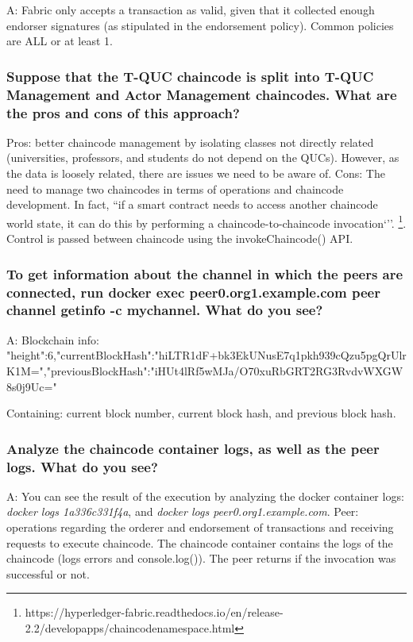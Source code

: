 \documentclass[12pt,a4paper]{article}
\begin{document}
A:  Fabric only accepts a transaction as valid, given that it collected enough endorser signatures (as stipulated in the endorsement policy). Common policies are ALL or at least 1.

\subsubsection*{Suppose that the T-QUC chaincode is split into T-QUC Management and Actor Management chaincodes. What are the pros and cons of this approach?}

Pros: better chaincode management by isolating classes not directly related (universities, professors, and students do not depend on the QUCs).  However, as the data is loosely related, there are issues we need to be aware of.
Cons: The need to manage two chaincodes in terms of operations and chaincode development. In fact, ``if a smart contract needs to access another chaincode world state, it can do this by performing a chaincode-to-chaincode invocation`''.  \footnote{https://hyperledger-fabric.readthedocs.io/en/release-2.2/developapps/chaincodenamespace.html}. Control is passed between chaincode using the invokeChaincode() API.

\subsubsection*{To get information about the channel in which the peers are connected, run {docker exec peer0.org1.example.com peer channel getinfo -c mychannel}. What do you see?}

A: Blockchain info: {"height":6,"currentBlockHash":"hiLTR1dF+bk3EkUNusE7q1pkh939cQzu5pgQrUlrK1M=","previousBlockHash":"iHUt4lRf5wMJa/O70xuRbGRT2RG3RvdvWXGW8s0j9Uc="}

Containing: current block number, current block hash, and previous block hash.

\subsubsection*{Analyze the chaincode container logs, as well as the peer logs. What do you see?}

A: You can see the result of the execution by analyzing the docker container logs: \emph{docker logs 1a336c331f4a}, and \emph{docker logs peer0.org1.example.com}.
Peer: operations regarding the orderer and endorsement of transactions and receiving requests to execute chaincode. The chaincode container contains the logs of the chaincode (logs errors and console.log()). The peer returns if the invocation was successful or not.
\end{document}
